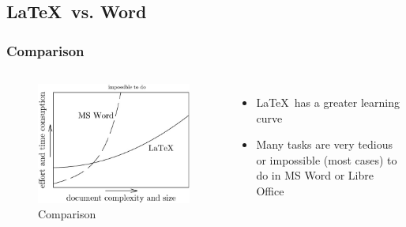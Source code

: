 \documentclass[10pt]{beamer}
\begin{document}
\subsection{\LaTeX \, vs. Word}
\begin{frame}\frametitle{Comparison}
\begin{columns}[c] %

\begin{figure}[h!]
\centering
\includegraphics[scale=1, keepaspectratio]{./miktex}
\caption{Comparison}
\label{fig:word}
\end{figure}

\begin{itemize}
\item \LaTeX \, has a greater learning curve
\item Many tasks are very tedious or impossible (most cases) to do in MS Word or Libre Office
\end{itemize}
\end{columns}

\end{frame}


\end{document}
